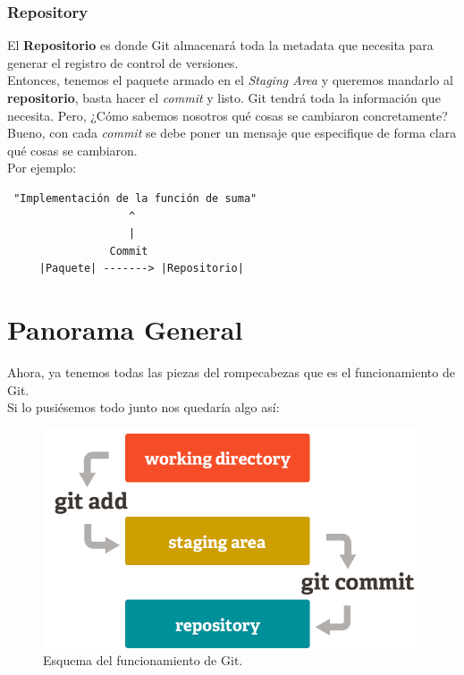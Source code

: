 \documentclass[a4paper, 12pt]{article}
\begin{document}
\subsubsection{Repository}
El \textbf{Repositorio} es donde Git almacenará toda la metadata que necesita para generar el registro de control de versiones.\\

Entonces, tenemos el paquete armado en el \textit{Staging Area} y queremos mandarlo al \textbf{repositorio}, basta hacer el \textit{commit} y listo. Git tendrá toda la información que necesita.
Pero, ¿Cómo sabemos nosotros qué cosas se cambiaron concretamente?
Bueno, con cada \textit{commit} se debe poner un mensaje que especifique de forma clara qué cosas se cambiaron.\\

Por ejemplo:

\begin{verbatim}
 "Implementación de la función de suma"
                   ^
                   |
                Commit
     |Paquete| -------> |Repositorio|
\end{verbatim}

\section*{Panorama General}
Ahora, ya tenemos todas las piezas del rompecabezas que es el funcionamiento de Git.\\ Si lo pusiésemos todo junto nos quedaría algo así:\\

\begin{figure}[h!]
\centering
\includegraphics[scale=0.35]{panoramaGen.png}
\caption{\small Esquema del funcionamiento de Git.}
\end{figure}
\end{document}
